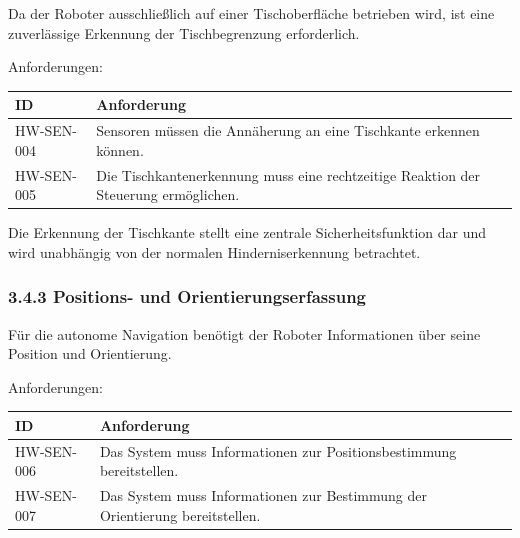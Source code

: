 \documentclass[
  a4paper,
  12pt,
  DIV=12,        %
  parskip=half,  %
  headings=small %
]{scrartcl}
\theoremstyle{definition}
\theoremstyle{definition}
\begin{document}
Da der Roboter ausschließlich auf einer Tischoberfläche betrieben wird,
ist eine zuverlässige Erkennung der Tischbegrenzung erforderlich.

Anforderungen:

\begin{longtable}[]{@{}
  >{\raggedright\arraybackslash}p{}
  >{\raggedright\arraybackslash}p{}@{}}
\toprule\noalign{}
\begin{minipage}[b]{\linewidth}\raggedright
ID
\end{minipage} & \begin{minipage}[b]{\linewidth}\raggedright
Anforderung
\end{minipage} \\
\midrule\noalign{}
\endhead
\bottomrule\noalign{}
\endlastfoot
HW-SEN-004 & Sensoren müssen die Annäherung an eine Tischkante erkennen
können. \\
HW-SEN-005 & Die Tischkantenerkennung muss eine rechtzeitige Reaktion
der Steuerung ermöglichen. \\
\end{longtable}

Die Erkennung der Tischkante stellt eine zentrale Sicherheitsfunktion
dar und wird unabhängig von der normalen Hinderniserkennung betrachtet.

\subsubsection{3.4.3 Positions- und
Orientierungserfassung}\label{positions--und-orientierungserfassung}

Für die autonome Navigation benötigt der Roboter Informationen über
seine Position und Orientierung.

Anforderungen:

\begin{longtable}[]{@{}
  >{\raggedright\arraybackslash}p{}
  >{\raggedright\arraybackslash}p{}@{}}
\toprule\noalign{}
\begin{minipage}[b]{\linewidth}\raggedright
ID
\end{minipage} & \begin{minipage}[b]{\linewidth}\raggedright
Anforderung
\end{minipage} \\
\midrule\noalign{}
\endhead
\bottomrule\noalign{}
\endlastfoot
HW-SEN-006 & Das System muss Informationen zur Positionsbestimmung
bereitstellen. \\
HW-SEN-007 & Das System muss Informationen zur Bestimmung der
Orientierung bereitstellen. \\
\end{longtable}
\end{document}
